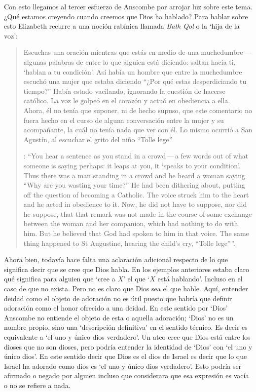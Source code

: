 Con esto llegamos al tercer esfuerzo de Anscombe por arrojar luz sobre este tema. ¿Qué estamos creyendo cuando creemos que Dios ha hablado? Para hablar sobre esto Elizabeth recurre a una noción rabínica llamada \emph{Bath Qol} o la `hija de la voz': \blockquote[{\Cite[118-119]{anscombe1981erp:faith}}: \enquote{You hear a sentence as you stand in a crowd\,---\,a few words out of what someone is saying perhaps: it leaps at you, it `speaks to your condition'. Thus there was a man standing in a crowd and he heard a woman saying ``Why are you wasting your time?'' He had been dithering about, putting off the question of becoming a Catholic. The voice struck him to the heart and he acted in obedience to it. Now, he did not have to suppose, nor did he suppose, that that remark was not made in the course of some exchange between the woman and her companion, which had nothing to do with him. But he believed that God had spoken to him in that voice. The same thing happened to St Augustine, hearing the child's cry, ``Tolle lege''}.]{Escuchas una oración mientras que estás en medio de una muchedumbre\,---\,algunas palabras de entre lo que alguien está diciendo: saltan hacia ti, `hablan a tu condición'. Así había un hombre que entre la muchedumbre escuchó una mujer que estaba diciendo ``¿Por qué estas desperdiciando tu tiempo?'' Había estado vacilando, ignorando la cuestión de hacerse católico. La voz le golpeó en el corazón y actuó en obediencia a ella. Ahora, él no tenía que suponer, ni de hecho supuso, que este comentario no fuera hecho en el curso de alguna conversación entre la mujer y su acompañante, la cuál no tenía nada que ver con él. Lo mismo ocurrió a San Agustín, al escuchar el grito del niño ``Tolle lege''}.

Ahora bien, todavía hace falta una aclaración adicional respecto de lo que significa decir que se cree que Dios habla. En los ejemplos anteriores estaba claro qué significa para alguien que \enquote*{cree a $X$} el que \enquote*{$X$ está hablando}. Incluso en el caso de que no exista. Pero no es claro que Dios sea el que hable. Aquí, entender deidad como el objeto de adoración no es útil puesto que habría que definir adoración como el honor ofrecido a una deidad. En este sentido por `Dios' Anscombe no entiende el objeto de esta o aquella adoración; `Dios' no es un nombre propio, sino una `descripción definitiva' en el sentido técnico. Es decir es equivalente a `el uno y único dios verdadero'. Un ateo cree que Dios está entre los dioses que no son dioses, pero podría entender la identidad de `Dios' con `el uno y único dios'. En este sentido decir que Dios es el dios de Israel es decir que lo que Israel ha adorado como dios es `el uno y único dios verdadero'. Esto podría ser afirmado o negado por alguien incluso que considerara que esa expresión es vacía o no se refiere a nada.

